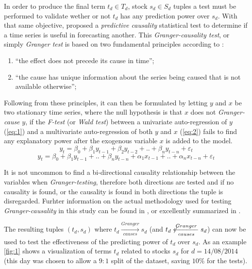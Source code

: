 \documentclass{article}
\begin{document}
\par
In order to produce the final term \(t_d \in T_d\), stock \(s_d \in S_d\) tuples a test must be performed to validate wether or not \(t_d\) has any prediction power over \(s_d\). With that same objective, \citep{Granger1969,Granger1980} proposed a \textit{predictive causality} statistical test to determine if a time series is useful in forecasting another. This \textit{Granger-causality test}, or simply \textit{Granger test} is based on two fundamental principles  according to \citep{eichler2012}:
\begin{enumerate}
\item ``the effect does not precede its cause in time'';
\item ``the cause has unique information about the series being caused that is not available otherwise'';
\end{enumerate}

\par
Following from these principles, it can then be formulated by letting \(y\) and \(x\) be two stationary time series, where the null hypothesis is that \(x\) does not \textit{Granger-cause} \(y\), if the \textit{F-test} (or \textit{Wald test}) between a univariate auto-regression of \(y\) (\ref{eq:1}) and a multivariate auto-regression of both \(y\) and \(x\) (\ref{eq:2}) fails to find any explanatory power after the exogenous variable \(x\) is added to the model.
\begin{equation}
\label{eq:1}
y_t=\beta_0 + \beta_1 y_{t-1} + \beta_2 y_{t-2} + .. + \beta_n y_{t-n} + \varepsilon_t
\end{equation}
\begin{equation}
\label{eq:2}
y_t=\beta_0 + \beta_1 y_{t-1} + .. + \beta_n y_{t-n} + 
\alpha_1 x_{t-1} + .. + \alpha_n x_{t-n}
+ \varepsilon_t
\end{equation}

\par
It is not uncommon to find a bi-directional causality relationship between the variables when \textit{Granger-testing}, therefore both directions are tested and if no causality is found, or the causality is found in both directions the tuple is disregarded. Furhter information on the actual methodology used for testing \textit{Granger-causality} in this study can be found in \citep{Toda1995}, or excellently summarized in \citep{Giles2011}.

\par
The resulting tuples \((t_d, s_d)\) where \(t_d \xrightarrow[causes]{Granger} s_d\) (and \(t_d \not\xleftarrow[causes]{Granger} s_d\)) can now be used to test the effectiveness of the predicting power of \(t_d\) over \(s_d\). As an example \ref{fig:1} shows a visualization of terms \(t_d\) related to stocks \(s_d\) for \(d=14/08/2014\) (this day was chosen to allow a \(9:1\) split of the dataset, saving \(10\%\) for the tests).
\end{document}
